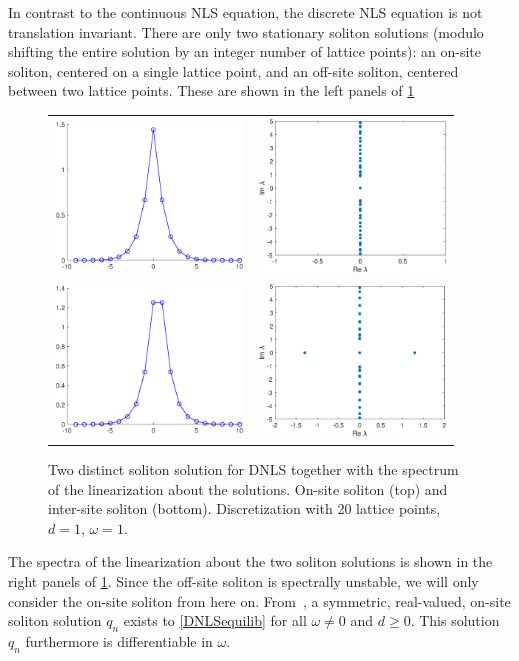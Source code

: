 \documentclass[thesis.tex]{subfiles}
\begin{document}
In contrast to the continuous NLS equation, the discrete NLS equation is not translation invariant. There are only two stationary soliton solutions (modulo shifting the entire solution by an integer number of lattice points): an on-site soliton, centered on a single lattice point, and an off-site soliton, centered between two lattice points. These are shown in the left panels of \cref{fig:DNLSsingle}
\begin{figure}
\centering
\begin{tabular}{cc}
\includegraphics[width=5cm]{images/other/onsite}&
\includegraphics[width=5cm]{images/other/onsitespec} \\
\includegraphics[width=5cm]{images/other/intersite}&
\includegraphics[width=5cm]{images/other/intersitespec}
\end{tabular}
\caption[On-site and inter-site solitons for DNLS]{Two distinct soliton solution for DNLS together with the spectrum of the linearization about the solutions. On-site soliton (top) and inter-site soliton (bottom). Discretization with 20 lattice points, $d = 1$, $\omega = 1$.}
\label{fig:DNLSsingle}
\end{figure}
The spectra of the linearization about the two soliton solutions is shown in the right panels of \cref{fig:DNLSsingle}. Since the off-site soliton is spectrally unstable, we will only consider the on-site soliton from here on. From~\cite{herrmann_2011}, a symmetric, real-valued, on-site soliton solution $q_n$ exists to \cref{DNLSequilib} for all $\omega \neq 0$ and $d \geq 0$. This solution $q_n$ furthermore is differentiable in $\omega$. 
\end{document}
